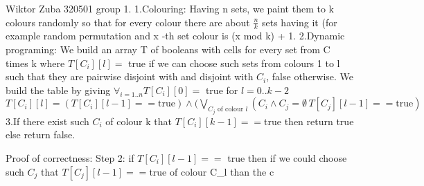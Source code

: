 \documentclass{article}
\begin{document}
Wiktor Zuba 320501 group 1.
\newline\newline
1.Colouring:\newline
Having n sets, we paint them to k colours randomly so that for every colour there are about $\frac{n}{k}$ sets having it (for example random permutation and x -th set colour is (x mod k) + 1.\newline
2.Dynamic programing:\newline
We build an array T of booleans with cells for every set from C times k where $T[C_i][l]=$ true if we can choose such sets from colours 1 to l
such that they are pairwise disjoint with and disjoint with $C_i$, false otherwise.\newline
We build the table by giving $\forall_{i=1..n} T[C_i][0]=$ true\newline
for $l=0..k-2$ $T[C_i][l]=(T[C_i][l-1]==\text{true})\wedge(\bigvee_{C_j\text{ of colour } l}(C_i\wedge C_j=\emptyset\,T[C_j][l-1]==\text{true})$\newline
3.If there exist such $C_i$ of colour k that $T[C_i][k-1]==$true then return true else return false.\newline\newline

Proof of correctness:\newline
Step 2: if $T[C_i][l-1]==$ true then if we could choose such $C_j$ that $T[C_j][l-1]==$true of colour C_l than the c 
\end{document}
